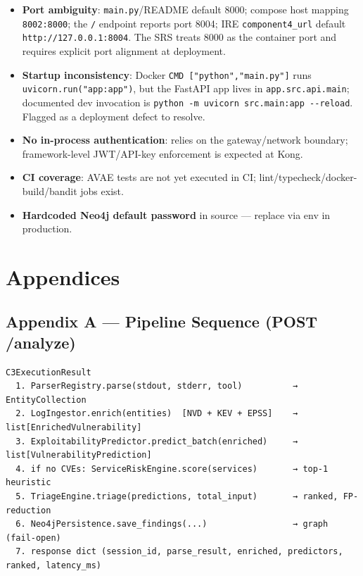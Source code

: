 \documentclass[10pt,journal,onecolumn]{IEEEtran}
\begin{document}
\begin{itemize}
\item \textbf{Port ambiguity}: \texttt{main.py}/README default 8000; compose host mapping \texttt{8002:8000}; the \texttt{/} endpoint reports port 8004; IRE \texttt{component4\_url} default \texttt{http://127.0.0.1:8004}. The SRS treats 8000 as the container port and requires explicit port alignment at deployment.
\item \textbf{Startup inconsistency}: Docker \texttt{CMD ["python","main.py"]} runs \texttt{uvicorn.run("app:app")}, but the FastAPI app lives in \texttt{app.src.api.main}; documented dev invocation is \texttt{python -\allowbreak m uvicorn src.\allowbreak main:\allowbreak app -\allowbreak -\allowbreak reload}. Flagged as a deployment defect to resolve.
\item \textbf{No in-process authentication}: relies on the gateway/network boundary; framework-level JWT/API-key enforcement is expected at Kong.
\item \textbf{CI coverage}: AVAE tests are not yet executed in CI; lint/typecheck/docker-build/bandit jobs exist.
\item \textbf{Hardcoded Neo4j default password} in source --- replace via env in production.
\end{itemize}

\section{Appendices}

\subsection{Appendix A --- Pipeline Sequence (POST /analyze)}

\begin{lstlisting}
C3ExecutionResult
  1. ParserRegistry.parse(stdout, stderr, tool)          → EntityCollection
  2. LogIngestor.enrich(entities)  [NVD + KEV + EPSS]    → list[EnrichedVulnerability]
  3. ExploitabilityPredictor.predict_batch(enriched)     → list[VulnerabilityPrediction]
  4. if no CVEs: ServiceRiskEngine.score(services)       → top-1 heuristic
  5. TriageEngine.triage(predictions, total_input)       → ranked, FP-reduction
  6. Neo4jPersistence.save_findings(...)                 → graph (fail-open)
  7. response dict (session_id, parse_result, enriched, predictors, ranked, latency_ms)
\end{lstlisting}
\end{document}
